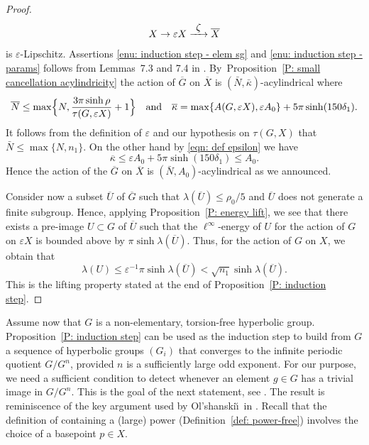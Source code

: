 \documentclass[11pt]{article}
\newcommand\To[1]{\mathchoice{\xrightarrow{\textstyle\kern4pt#1\kern3pt}}{\stackrel{#1}{\longrightarrow}}{}{}}
\theoremstyle{plain}
\theoremstyle{definition}
\newcommand{\q}[1]{\overline{#1}}
\begin{document}
\begin{proof}
\begin{equation*}
X \to \varepsilon X \To\zeta \q X
\end{equation*}
is $\varepsilon$-Lipschitz.
Assertions \eqref{enu: induction step - elem sg} and \eqref{enu: induction step - params} follows from Lemmas~7.3 and 7.4 in \cite{coulon_geometry_2014}.
By~Proposition~\ref{P: small cancellation acylindricity} the action of $\q G$ on $\q X$ is $(\bar N, \bar \kappa)$-acylindrical where
\begin{equation*}
\q N \leq \max\Bigl\{N, \frac{3\pi\sinh\rho}{\tau(G,\varepsilon X)}+1\Bigr\}
\quad \text{and} \quad
\q \kappa = \max \{A(G, \varepsilon X), \varepsilon A_0\} + 5\pi \sinh (150\delta_1).
\end{equation*}
It follows from the definition of $\varepsilon$ and our hypothesis on $\tau(G,X)$ that $\bar N \leq \max\{ N, n_1\}$.
On the other hand by \eqref{eqn: def epsilon} we have
\begin{equation*}
\q \kappa \leq \varepsilon A_0 + 5\pi \sinh (150\delta_1) \leq A_0.
\end{equation*}
Hence the action of the $\q G$ on $\q X$ is $(\bar N, A_0)$-acylindrical as we announced.

Consider now a subset $\q U$ of $\q G$ such that $\lambda(\q U) \leq \rho_0 /5$ and $\q U$ does not generate a finite subgroup.
Hence, applying Proposition~\ref{P: energy lift}, we see that there exists a pre-image $U \subset G$ of $\q U$ such that the $\ell^{\infty}$-energy of $U$ for the action of $G$ on $\varepsilon X$ is bounded above by $\pi \sinh \lambda(\q U)$.
Thus, for the action of $G$ on $X$, we obtain that
\[
\lambda (U)\leqslant \varepsilon^{-1} \pi \sinh \lambda(\q U) < \sqrt{n_1} \sinh \lambda(\q U). 
\]
This is the lifting property stated at the end of Proposition~\ref{P: induction step}.
\end{proof}

Assume now that $G$ is a non-elementary, torsion-free hyperbolic group.
Proposition~\ref{P: induction step} can be used as the induction step to build from $G$ a sequence of hyperbolic groups $(G_i)$ that converges to the infinite periodic quotient $G/G^n$, provided $n$ is a sufficiently large odd exponent.
For our purpose, we need a sufficient condition to detect whenever an element $g \in G$ has a trivial image in $G/G^n$.
This is the goal of the next statement, see \cite[Th.\,4.13]{coulon_detecting_2018}.
The result is reminiscence of the key argument used by Ol'shanski\u\i\ in \cite[\S10]{olshanskii_periodic_1991}.
Recall that the definition of containing a (large) power (Definition~\ref{def: power-free}) involves the choice of a basepoint $p \in X$.
\end{document}
